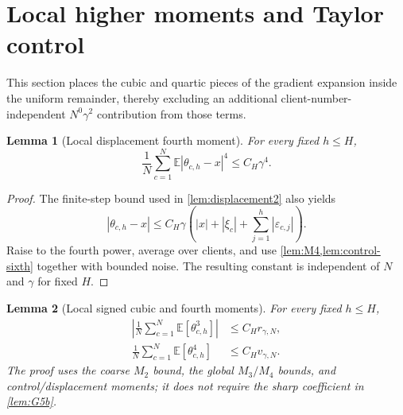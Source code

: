 \documentclass[11pt]{article}
\newtheorem{lemma}[lemma]{Lemma}
\theoremstyle{definition}
\newcommand{\E}{\mathbb{E}}
\newcommand{\remscale}{r_{\gamma,N}}
\newcommand{\fourthscale}{v_{\gamma,N}}
\newcommand{\eps}{\varepsilon}
\begin{document}
\section{Local higher moments and Taylor control}
\label{sec:local-higher}

This section places the cubic and quartic pieces of the gradient expansion inside the uniform remainder, thereby excluding an additional client-number-independent $N^0\gamma^2$ contribution from those terms.

\begin{lemma}[Local displacement fourth moment]
\label{lem:disp4}
For every fixed $h\le H$,
\begin{equation}
\label{eq:disp4-local}
  \frac1N\sum_{c=1}^N\E|\theta_{c,h}-x|^4\le C_H\gamma^4.
\end{equation}
\end{lemma}

\begin{proof}
The finite-step bound used in \cref{lem:displacement2} also yields
\[
  |\theta_{c,h}-x|
  \le C_H\gamma\left(|x|+|\xi_c|+\sum_{j=1}^h|\eps_{c,j}|\right).
\]
Raise to the fourth power, average over clients, and use \cref{lem:M4,lem:control-sixth} together with bounded noise. The resulting constant is independent of $N$ and $\gamma$ for fixed $H$.
\end{proof}

\begin{lemma}[Local signed cubic and fourth moments]
\label{lem:G6local}
For every fixed $h\le H$,
\begin{align}
  \left|\frac1N\sum_{c=1}^N\E[\theta_{c,h}^3]\right|
  &\le C_H\remscale,                                                     \label{eq:G6-cubic}\\
  \frac1N\sum_{c=1}^N\E[\theta_{c,h}^4]
  &\le C_H\fourthscale.                                                  \label{eq:G6-fourth}
\end{align}
The proof uses the coarse $M_2$ bound, the global $M_3/M_4$ bounds, and control/displacement moments; it does not require the sharp coefficient in \cref{lem:G5b}.
\end{lemma}
\end{document}
